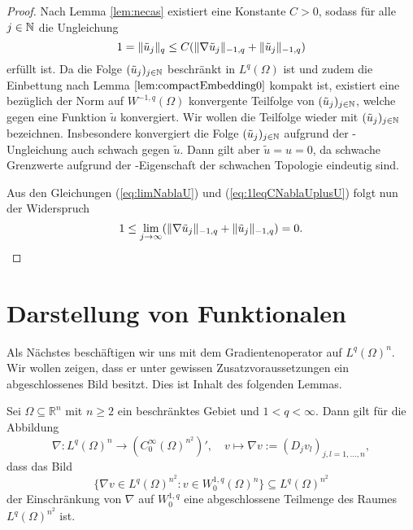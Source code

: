 \begin{proof}
  Nach Lemma \ref{lem:necas} existiert eine Konstante $C > 0$, sodass für alle $j \in \mathbb{N}$ die Ungleichung
  \begin{equation}
    \label{eq:1leqCNablaUplusU}
    1 = \lVert \tilde u_j \rVert_q \leq C (\lVert \nabla \tilde u_j \rVert_{-1,q} + \lVert \tilde u_j \rVert_{-1,q})
  \end{equation}
  erfüllt ist.
  Da die Folge $(\tilde u_j)_{j \in \mathbb{N}}$ beschränkt in $L^q(\Omega)$ ist und zudem die Einbettung nach Lemma $\ref{lem:compactEmbedding0}$ kompakt ist, existiert eine bezüglich der Norm auf $W^{-1,q}(\Omega)$ konvergente Teilfolge von $(\tilde u_j)_{j \in \mathbb{N}}$, welche gegen eine Funktion $\tilde u$ konvergiert. 
  Wir wollen die Teilfolge wieder mit $(\tilde u_j)_{j \in \mathbb{N}}$ bezeichnen.
  Insbesondere konvergiert die Folge $(\tilde u_j)_{j \in \mathbb{N}}$ aufgrund der \hoelder\hyp{}Ungleichung auch schwach gegen $\tilde u$.
  Dann gilt aber $\tilde u = u = 0$, da schwache Grenzwerte aufgrund der \hausdorff\hyp{}Eigenschaft der schwachen Topologie eindeutig sind.

  Aus den Gleichungen (\ref{eq:limNablaU}) und (\ref{eq:1leqCNablaUplusU}) folgt nun der Widerspruch
  \begin{displaymath}
  1 \leq \lim_{j \to \infty} ( \lVert \nabla \tilde u_j  \rVert_{-1,q} + \lVert \tilde u_j \rVert_{-1,q} ) = 0.\qedhere
  \end{displaymath}
  

\end{proof}

\newpage
\section{Darstellung von Funktionalen}

Als Nächstes beschäftigen wir uns mit dem Gradientenoperator auf $L^q(\Omega)^n$.
Wir wollen zeigen, dass er unter gewissen Zusatzvoraussetzungen ein abgeschlossenes Bild besitzt.
Dies ist Inhalt des folgenden Lemmas.

\begin{lem}
  \label{lem:closedImageGradient}
  Sei $\Omega \subseteq \mathbb{R}^n$ mit $n \geq 2$ ein beschränktes Gebiet und $1 < q < \infty$.
  Dann gilt für die Abbildung
  $$
  \nabla \colon L^{q}(\Omega)^{n} \to (C_0^\infty(\Omega)^{n^2})',
  \quad v \mapsto \nabla v := (D_j v_l)_{j,l=1,\dots,n}, 
  $$
  dass das Bild
  $$
  \{\nabla v \in L^{q}(\Omega)^{n^2} \colon v \in W_0^{1,q}(\Omega)^n\} \subseteq L^{q}(\Omega)^{n^2}
  $$
  der Einschränkung von $\nabla$ auf $W_0^{1,q}$ eine abgeschlossene Teilmenge des Raumes $L^q(\Omega)^{n^2}$ ist.
\end{lem}

